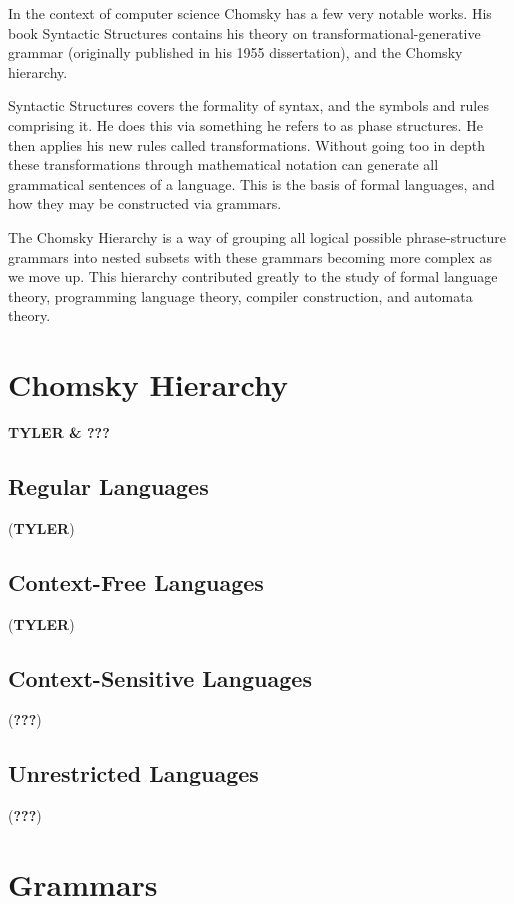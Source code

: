 \documentclass{article}
\begin{document}
In the context of computer science Chomsky has a few very notable works. 
His book Syntactic Structures contains his theory on transformational-generative grammar (originally published in his 1955 dissertation), and the Chomsky hierarchy.
\medskip

Syntactic Structures covers the formality of syntax, and the symbols and rules comprising it. He does this via something he refers to as phase structures. 
He then applies his new rules called transformations. Without going too in depth these transformations through mathematical notation can generate all grammatical sentences of a language. 
This is the basis of formal languages, and how they may be constructed via grammars. 
\medskip

The Chomsky Hierarchy is a way of grouping all logical possible phrase-structure grammars into nested subsets with these grammars becoming more complex as we move up. 
This hierarchy contributed greatly to the study of formal language theory, programming language theory, compiler construction, and automata theory.


\section{Chomsky Hierarchy}  
\textbf{TYLER \& ???}

\subsection{Regular Languages} (\textbf{TYLER})

\subsection{Context-Free Languages} (\textbf{TYLER})

\subsection{Context-Sensitive Languages} (\textbf{???})

\subsection{Unrestricted Languages} (\textbf{???})

\section{Grammars}
\end{document}
